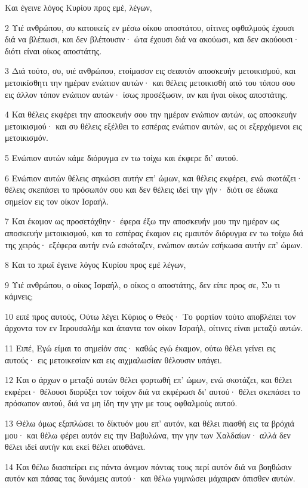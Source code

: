 \par Και έγεινε λόγος Κυρίου προς εμέ, λέγων,
\par 2 Υιέ ανθρώπου, συ κατοικείς εν μέσω οίκου αποστάτου, οίτινες οφθαλμούς έχουσι διά να βλέπωσι, και δεν βλέπουσιν· ώτα έχουσι διά να ακούωσι, και δεν ακούουσι· διότι είναι οίκος αποστάτης.
\par 3 Διά τούτο, συ, υιέ ανθρώπου, ετοίμασον εις σεαυτόν αποσκευήν μετοικισμού, και μετοικίσθητι την ημέραν ενώπιον αυτών· και θέλεις μετοικισθή από του τόπου σου εις άλλον τόπον ενώπιον αυτών· ίσως προσέξωσιν, αν και ήναι οίκος αποστάτης.
\par 4 Και θέλεις εκφέρει την αποσκευήν σου την ημέραν ενώπιον αυτών, ως αποσκευήν μετοικισμού· και συ θέλεις εξέλθει το εσπέρας ενώπιον αυτών, ως οι εξερχόμενοι εις μετοικισμόν.
\par 5 Ενώπιον αυτών κάμε διόρυγμα εν τω τοίχω και έκφερε δι' αυτού.
\par 6 Ενώπιον αυτών θέλεις σηκώσει αυτήν επ' ώμων, και θέλεις εκφέρει, ενώ σκοτάζει· θέλεις σκεπάσει το πρόσωπόν σου και δεν θέλεις ιδεί την γήν· διότι σε έδωκα σημείον εις τον οίκον Ισραήλ.
\par 7 Και έκαμον ως προσετάχθην· έφερα έξω την αποσκευήν μου την ημέραν ως αποσκευήν μετοικισμού, και το εσπέρας έκαμον εις εμαυτόν διόρυγμα εν τω τοίχω διά της χειρός· εξέφερα αυτήν ενώ εσκόταζεν, ενώπιον αυτών εσήκωσα αυτήν επ' ώμων.
\par 8 Και το πρωΐ έγεινε λόγος Κυρίου προς εμέ λέγων,
\par 9 Υιέ ανθρώπου, ο οίκος Ισραήλ, ο οίκος ο αποστάτης, δεν είπε προς σε, Συ τι κάμνεις;
\par 10 ειπέ προς αυτούς, Ούτω λέγει Κύριος ο Θεός· Το φορτίον τούτο αποβλέπει τον άρχοντα τον εν Ιερουσαλήμ και άπαντα τον οίκον Ισραήλ, οίτινες είναι μεταξύ αυτών.
\par 11 Ειπέ, Εγώ είμαι το σημείόν σας· καθώς εγώ έκαμον, ούτω θέλει γείνει εις αυτούς· εις μετοικεσίαν και εις αιχμαλωσίαν θέλουσιν υπάγει.
\par 12 Και ο άρχων ο μεταξύ αυτών θέλει φορτωθή επ' ώμων, ενώ σκοτάζει, και θέλει εκφέρει· θέλουσι διορύξει τον τοίχον διά να εκφέρωσι δι' αυτού· θέλει σκεπάσει το πρόσωπον αυτού, διά να μη ίδη την γην με τους οφθαλμούς αυτού.
\par 13 Θέλω όμως εξαπλώσει το δίκτυόν μου επ' αυτόν, και θέλει πιασθή εις τα βρόχιά μου· και θέλω φέρει αυτόν εις την Βαβυλώνα, την γην των Χαλδαίων· αλλά δεν θέλει ιδεί αυτήν και εκεί θέλει αποθάνει.
\par 14 Και θέλω διασπείρει εις πάντα άνεμον πάντας τους περί αυτόν διά να βοηθώσιν αυτόν και πάσας τας δυνάμεις αυτού· και θέλω γυμνώσει μάχαιραν όπισθεν αυτών.
